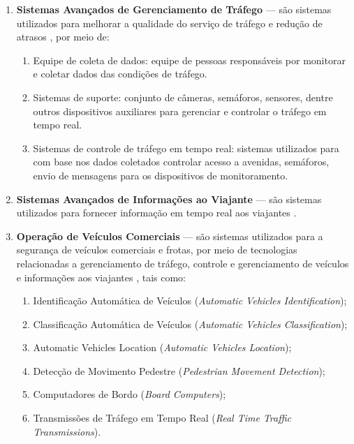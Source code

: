 \documentclass[
	12pt,				%
	oneside,			%
	a4paper,			%
	english,			%
	brazil				%
	]{abntex2ppgsi}
\begin{document}
{\begin{enumerate}
\item \textbf{Sistemas Avançados de Gerenciamento de Tráfego}  --- são sistemas utilizados para melhorar a qualidade do serviço de tráfego e redução de atrasos \cite{figueiredo2001towards}, por meio de:
\begin{enumerate}
\item Equipe de coleta de dados: equipe de pessoas responsáveis por monitorar e coletar dados das condições de tráfego.
\item Sistemas de suporte: conjunto de câmeras, semáforos, sensores, dentre outros dispositivos auxiliares para gerenciar e controlar o tráfego em tempo real.
\item Sistemas de controle de tráfego em tempo real: sistemas utilizados para com base nos dados coletados controlar acesso a avenidas, semáforos, envio de mensagens para os dispositivos de monitoramento.
\end{enumerate}
\item \textbf{Sistemas Avançados de Informações ao Viajante}  --- são sistemas utilizados para fornecer informação em tempo real aos viajantes \cite{figueiredo2001towards}.
\item \textbf{Operação de Veículos Comerciais}  --- são sistemas utilizados para a segurança de veículos comerciais e frotas, por meio de tecnologias relacionadas a gerenciamento de tráfego, controle e gerenciamento de veículos e informações aos viajantes \cite{figueiredo2001towards}, tais como:
\begin{enumerate}
\item Identificação Automática de Veículos (\textit{Automatic Vehicles Identification});
\item Classificação Automática de Veículos (\textit{Automatic Vehicles Classification});
\item Automatic Vehicles Location (\textit{Automatic Vehicles Location});
\item Detecção de Movimento Pedestre (\textit{Pedestrian Movement Detection});
\item Computadores de Bordo (\textit{Board Computers});
\item Transmissões de Tráfego em Tempo Real (\textit{Real Time Traffic Transmissions}).

\end{enumerate}
\end{enumerate}}
\end{document}
